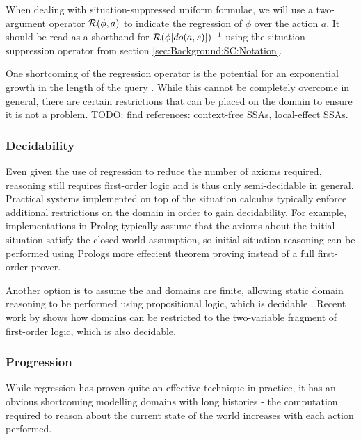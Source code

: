 When dealing with situation-suppressed uniform formulae, we will use
a two-argument operator $\mathcal{R}(\phi,a)$ to indicate the regression
of $\phi$ over the action $a$. It should be read as a shorthand
for $\mathcal{R}(\phi[do(a,s)])^{-1}$ using the situation-suppression operator
from section \ref{sec:Background:SC:Notation}.

One shortcoming of the regression operator is the potential for an
exponential growth in the length of the query \citep{reiter91frameprob}.
While this cannot be completely overcome in general, there are certain
restrictions that can be placed on the domain to ensure it is not
a problem. TODO: find references: context-free SSAs, local-effect
SSAs.


\subsubsection{Decidability}

Even given the use of regression to reduce the number of axioms required,
reasoning still requires first-order logic and is thus only semi-decidable
in general. Practical systems implemented on top of the situation
calculus typically enforce additional restrictions on the domain in
order to gain decidability. For example, implementations in Prolog
typically assume that the axioms about the initial situation satisfy
the closed-world assumption, so initial situation reasoning can be
performed using Prologs more effecient theorem proving instead of
a full first-order prover.

Another option is to assume the  and  domains
are finite, allowing static domain reasoning to be performed using
propositional logic, which is decidable \citep{giacomo99impl_robots,levesque04krr_book}.
Recent work by \citet{yu07twovar_sitcalc} shows how domains can be
restricted to the two-variable fragment of first-order logic, which
is also decidable.\\



\subsubsection{Progression}

While regression has proven quite an effective technique in practice,
it has an obvious shortcoming modelling domains with long histories
- the computation required to reason about the current state of the
world increases with each action performed.

